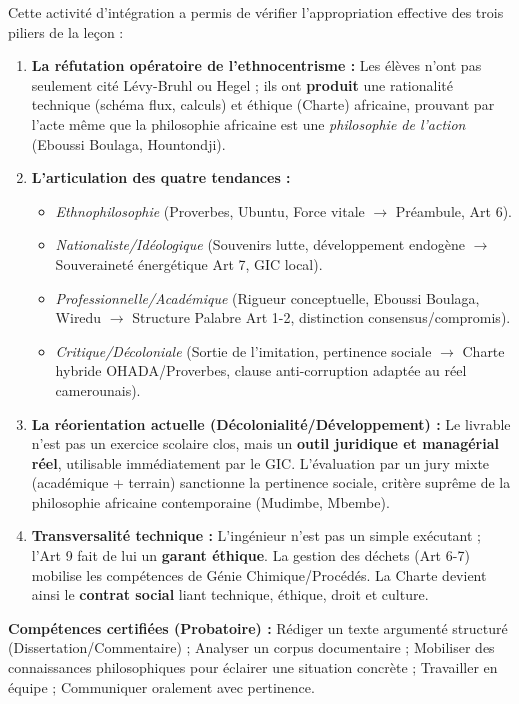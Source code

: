\documentclass[11pt]{article}
\newcommand{\cle}[1]{{\popxbold\color{popdark}#1}}
\newcounter{popsec}
\newcounter{popsub}
\newcommand{\courssub}[1]{%
  \stepcounter{popsub}%
  \par\vspace{9pt}\noindent{\popxbold\fontsize{11.5}{13}\selectfont\color{popink}{\color{poporange}\thepopsec.\thepopsub}\hspace{6pt}#1}\par\nopagebreak\vspace{4pt}
}
\begin{document}
\courssub{Bilan de l'activité}
Cette activité d'intégration a permis de vérifier l'appropriation effective des trois piliers de la leçon :
\begin{enumerate}
    \item \textbf{La réfutation opératoire de l'ethnocentrisme :} Les élèves n'ont pas seulement cité Lévy-Bruhl ou Hegel ; ils ont \textbf{produit} une rationalité technique (schéma flux, calculs) et éthique (Charte) africaine, prouvant par l'acte même que la philosophie africaine est une \emph{philosophie de l'action} (Eboussi Boulaga, Hountondji).
    \item \textbf{L'articulation des quatre tendances :} 
    \begin{itemize}
        \item \textit{Ethnophilosophie} (Proverbes, Ubuntu, Force vitale $\rightarrow$ Préambule, Art 6).
        \item \textit{Nationaliste/Idéologique} (Souvenirs lutte, développement endogène $\rightarrow$ Souveraineté énergétique Art 7, GIC local).
        \item \textit{Professionnelle/Académique} (Rigueur conceptuelle, Eboussi Boulaga, Wiredu $\rightarrow$ Structure Palabre Art 1-2, distinction consensus/compromis).
        \item \textit{Critique/Décoloniale} (Sortie de l'imitation, pertinence sociale $\rightarrow$ Charte hybride OHADA/Proverbes, clause anti-corruption adaptée au réel camerounais).
    \end{itemize}
    \item \textbf{La réorientation actuelle (Décolonialité/Développement) :} Le livrable n'est pas un exercice scolaire clos, mais un \textbf{outil juridique et managérial réel}, utilisable immédiatement par le GIC. L'évaluation par un jury mixte (académique + terrain) sanctionne la \cle{pertinence sociale}, critère suprême de la philosophie africaine contemporaine (Mudimbe, Mbembe).
    \item \textbf{Transversalité technique :} L'ingénieur n'est pas un simple exécutant ; l'Art 9 fait de lui un \textbf{garant éthique}. La gestion des déchets (Art 6-7) mobilise les compétences de Génie Chimique/Procédés. La Charte devient ainsi le \textbf{contrat social} liant technique, éthique, droit et culture.
\end{enumerate}
\textbf{Compétences certifiées (Probatoire) :} Rédiger un texte argumenté structuré (Dissertation/Commentaire) ; Analyser un corpus documentaire ; Mobiliser des connaissances philosophiques pour éclairer une situation concrète ; Travailler en équipe ; Communiquer oralement avec pertinence.
\end{document}
